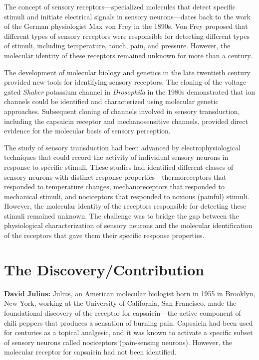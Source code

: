 The concept of sensory receptors---specialized molecules that detect specific stimuli and initiate electrical signals in sensory neurons---dates back to the work of the German physiologist Max von Frey in the 1890s. Von Frey proposed that different types of sensory receptors were responsible for detecting different types of stimuli, including temperature, touch, pain, and pressure. However, the molecular identity of these receptors remained unknown for more than a century.

The development of molecular biology and genetics in the late twentieth century provided new tools for identifying sensory receptors. The cloning of the voltage-gated \textit{Shaker} potassium channel in \textit{Drosophila} in the 1980s demonstrated that ion channels could be identified and characterized using molecular genetic approaches. Subsequent cloning of channels involved in sensory transduction, including the capsaicin receptor and mechanosensitive channels, provided direct evidence for the molecular basis of sensory perception.

The study of sensory transduction had been advanced by electrophysiological techniques that could record the activity of individual sensory neurons in response to specific stimuli. These studies had identified different classes of sensory neurons with distinct response properties---thermoreceptors that responded to temperature changes, mechanoreceptors that responded to mechanical stimuli, and nociceptors that responded to noxious (painful) stimuli. However, the molecular identity of the receptors responsible for detecting these stimuli remained unknown. The challenge was to bridge the gap between the physiological characterization of sensory neurons and the molecular identification of the receptors that gave them their specific response properties.

\section{The Discovery/Contribution}

\textbf{David Julius:} Julius, an American molecular biologist born in 1955 in Brooklyn, New York, working at the University of California, San Francisco, made the foundational discovery of the receptor for capsaicin---the active component of chili peppers that produces a sensation of burning pain. Capsaicin had been used for centuries as a topical analgesic, and it was known to activate a specific subset of sensory neurons called nociceptors (pain-sensing neurons). However, the molecular receptor for capsaicin had not been identified.

